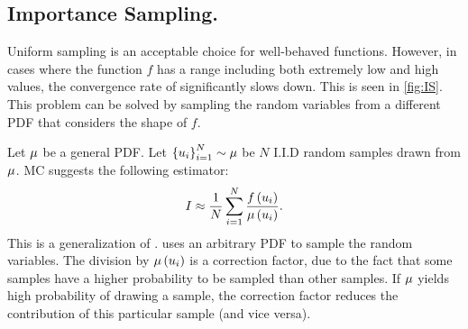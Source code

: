 \documentclass{article}
\begin{document}
\subsection{Importance Sampling.}
\label{sec:IS}
Uniform sampling is an acceptable choice for well-behaved functions. However, in cases where the function $f$ has a range including both extremely low and high values, the convergence rate of \eq{\ref{eq:MC_1d_estimator},\ref{eq:mc_lim}} significantly slows down. This is seen in \fig\ref{fig:IS}. This problem can be solved by sampling the random variables from a different \ac{PDF} that considers the shape of $f$.

Let $\mu$ be a general \ac{PDF}. Let $\left\{ {u_i}\right\}_{i=1}^N \sim \mu$ be $N$ \ac{I.I.D} random samples drawn from $\mu$. \ac{MC} suggests the following estimator:
\begin{equation}
\label{eq:IS_1d_estimator}
I \approx \frac{1}{N}\sum_{i=1}^N{\frac{f\left({u_i}\right)}{\mu\left({u_i}\right)}}.
\end{equation}
This is a generalization of \eq{\ref{eq:MC_1d_estimator}}. \eq{\ref{eq:IS_1d_estimator}} uses an arbitrary \ac{PDF} to sample the random variables. The division by $\mu\left({u_i}\right)$ is a correction factor, due to the fact that some samples have a higher probability to be sampled than other samples. If $\mu$ yields high probability of drawing a sample, the correction factor reduces the contribution of this particular sample (and vice versa).
\end{document}
